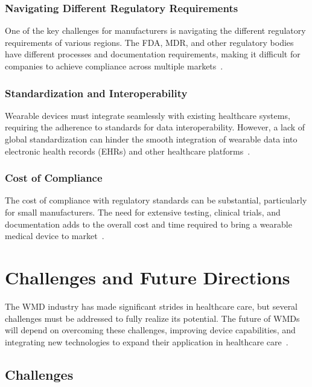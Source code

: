 \documentclass[journal]{IEEEtran}
\begin{document}
        \subsubsection{Navigating Different Regulatory Requirements}

        One of the key challenges for manufacturers is navigating the different regulatory requirements of various regions. The FDA, MDR, and other regulatory bodies have different processes and documentation requirements, making it difficult for companies to achieve compliance across multiple markets~\cite{Ravizza2019,FDA2023,EuropeanUnion2024}.

        \subsubsection{Standardization and Interoperability}

        Wearable devices must integrate seamlessly with existing healthcare systems, requiring the adherence to standards for data interoperability. However, a lack of global standardization can hinder the smooth integration of wearable data into electronic health records (EHRs) and other healthcare platforms~\cite{Ravizza2019}.

        \subsubsection{Cost of Compliance}

        The cost of compliance with regulatory standards can be substantial, particularly for small manufacturers. The need for extensive testing, clinical trials, and documentation adds to the overall cost and time required to bring a wearable medical device to market~\cite{Ravizza2019}.

\section{Challenges and Future Directions}
\label{9.Challenges}

The WMD industry has made significant strides in healthcare care, but several challenges must be addressed to fully realize its potential. The future of WMDs will depend on overcoming these challenges, improving device capabilities, and integrating new technologies to expand their application in healthcare care~\cite{Lu2020, Babu2024}.

    \subsection{Challenges}
\end{document}

